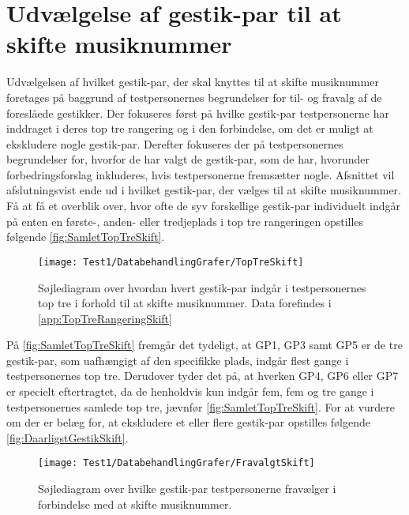 \section{Udvælgelse af gestik-par til at skifte musiknummer}
\label{TestresultaterSkiftMusiknummer}
%
Udvælgelsen af hvilket gestik-par, der skal knyttes til at skifte musiknummer foretages på baggrund af testpersonernes begrundelser for til- og fravalg af de foreslåede gestikker. Der fokuseres først på hvilke gestik-par testpersonerne har inddraget i deres top tre rangering og i den forbindelse, om det er muligt at ekskludere nogle gestik-par. Derefter fokuseres der på testpersonernes begrundelser for, hvorfor de har valgt de gestik-par, som de har, hvorunder forbedringsforslag inkluderes, hvis testpersonerne fremsætter nogle. Afsnittet vil afslutningsvist ende ud i hvilket gestik-par, der vælges til at skifte musiknummer.\blankline
%
Få at få et overblik over, hvor ofte de syv forskellige gestik-par individuelt indgår på enten en første-, anden- eller tredjeplads i top tre rangeringen opstilles følgende \autoref{fig:SamletTopTreSkift}. 
%
\begin{figure}[H]
	\centering
	\texttt{[image: Test1/DatabehandlingGrafer/TopTreSkift]}
	\caption{Søjlediagram over hvordan hvert gestik-par indgår i testpersonernes top tre i forhold til at skifte musiknummer. Data forefindes i \autoref{app:TopTreRangeringSkift}}
	\label{fig:SamletTopTreSkift}
\end{figure}
\noindent
%
På \autoref{fig:SamletTopTreSkift} fremgår det tydeligt, at GP1, GP3 samt GP5 er de tre gestik-par, som uafhængigt af den specifikke plads, indgår flest gange i testpersonernes top tre. Derudover tyder det på, at hverken GP4, GP6 eller GP7 er specielt eftertragtet, da de henholdvis kun indgår fem, fem og tre gange i testpersonernes samlede top tre, jævnfør \autoref{fig:SamletTopTreSkift}. For at vurdere om der er belæg for, at ekskludere et eller flere gestik-par opstilles følgende \autoref{fig:DaarligstGestikSkift}. 
%
\begin{figure}[H]
	\centering
	\texttt{[image: Test1/DatabehandlingGrafer/FravalgtSkift]}
	\caption{Søjlediagram over hvilke gestik-par testpersonerne fravælger i forbindelse med at skifte musiknummer.}
	\label{fig:DaarligstGestikSkift}
\end{figure}
\noindent
%
